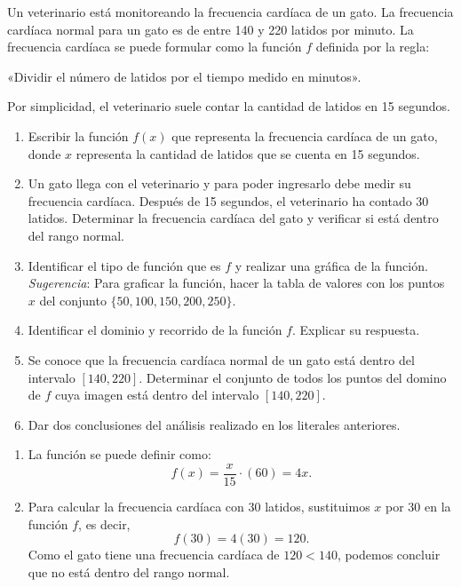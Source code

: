 \documentclass[11pt,a4]{aleph-examen}
\begin{document}
\begin{preguntas}

\item 
    Un veterinario está monitoreando la frecuencia cardíaca de un gato. La frecuencia cardíaca normal para un gato es de entre 140 y 220 latidos por minuto. La frecuencia cardíaca se puede formular como la función $f$ definida por la regla:
    \begin{center}
    	«Dividir el número de latidos por el tiempo medido en minutos».
    \end{center}
    Por simplicidad, el veterinario suele contar la cantidad de latidos en 15 segundos.
    \begin{enumerate}[label=\textit{\alph*)}]
    \item 
        Escribir la función $f(x)$ que representa la frecuencia cardíaca de un gato, donde $x$ representa la cantidad de latidos que se cuenta en 15 segundos. 
    \item 
        Un gato llega con el veterinario y para poder ingresarlo debe medir su frecuencia cardíaca. Después de 15 segundos, el veterinario ha contado 30 latidos. Determinar la frecuencia cardíaca del gato y verificar si está dentro del rango normal.
    \item 
        Identificar el tipo de función que es $f$ y realizar una gráfica de la función. \textit{Sugerencia}: Para graficar la función, hacer la tabla de valores con los puntos $x$ del conjunto $\{50,100,150,200,250\}$.
    \item 
        Identificar el dominio y recorrido de la función $f$. Explicar su respuesta.
    \item 
        Se conoce que la frecuencia cardíaca normal de un gato está dentro del intervalo $[140,220]$. Determinar el conjunto de todos los puntos del domino de $f$ cuya imagen está dentro del intervalo $[140,220]$.
    \item 
        Dar dos conclusiones del análisis realizado en los literales anteriores.
    \end{enumerate}
\begin{respuesta}
\begin{enumerate}[label=\textit{\alph*)}]
    \item
        La función se puede definir como:
        \[
            f(x) = \frac{x}{15} \cdot (60) = 4x.
        \]
    
    \item 
        Para calcular la frecuencia cardíaca con 30 latidos, sustituimos $x$ por $30$ en la función $f$, es decir,
        \[
            f(30) = 4(30) = 120.
        \]
        Como el gato tiene una frecuencia cardíaca de $120<140$, podemos concluir que no está dentro del rango normal.
    

\end{enumerate}
\end{respuesta}
\end{preguntas}
\end{document}
